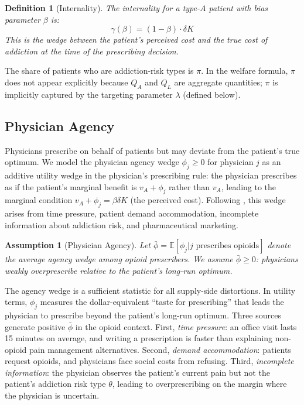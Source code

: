 \documentclass[12pt]{article}
\newcommand{\E}{\mathbb{E}}
\newtheorem{assumption}{Assumption}
\newtheorem{definition}{Definition}
\begin{document}
\begin{definition}[Internality]\label{def:internality}
The internality for a type-$A$ patient with bias parameter $\beta$ is:
\begin{equation}\label{eq:internality}
\gamma(\beta) = (1 - \beta) \cdot \delta K
\end{equation}
This is the wedge between the patient's perceived cost and the true cost of addiction at the time of the prescribing decision.
\end{definition}

The share of patients who are addiction-risk types is $\pi$. In the welfare formula, $\pi$ does not appear explicitly because $Q_A$ and $Q_L$ are aggregate quantities; $\pi$ is implicitly captured by the targeting parameter $\lambda$ (defined below).

\subsection{Physician Agency}\label{sec:framework_agency}

Physicians prescribe on behalf of patients but may deviate from the patient's true optimum. We model the physician agency wedge $\phi_j \geq 0$ for physician $j$ as an additive utility wedge in the physician's prescribing rule: the physician prescribes as if the patient's marginal benefit is $v_A + \phi_j$ rather than $v_A$, leading to the marginal condition $v_A + \phi_j = \beta \delta K$ (the perceived cost). Following \citet{schnell2017physician}, this wedge arises from time pressure, patient demand accommodation, incomplete information about addiction risk, and pharmaceutical marketing.

\begin{assumption}[Physician Agency]\label{as:agency}
Let $\bar{\phi} = \E[\phi_j | j \text{ prescribes opioids}]$ denote the average agency wedge among opioid prescribers. We assume $\bar{\phi} \geq 0$: physicians weakly overprescribe relative to the patient's long-run optimum.
\end{assumption}

The agency wedge is a sufficient statistic for all supply-side distortions. In utility terms, $\phi_j$ measures the dollar-equivalent ``taste for prescribing'' that leads the physician to prescribe beyond the patient's long-run optimum. Three sources generate positive $\bar{\phi}$ in the opioid context. First, \textit{time pressure}: an office visit lasts 15 minutes on average, and writing a prescription is faster than explaining non-opioid pain management alternatives. Second, \textit{demand accommodation}: patients request opioids, and physicians face social costs from refusing. Third, \textit{incomplete information}: the physician observes the patient's current pain but not the patient's addiction risk type $\theta$, leading to overprescribing on the margin where the physician is uncertain.
\end{document}
